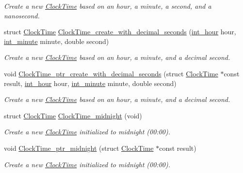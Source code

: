 \begin{DoxyCompactItemize}
\begin{DoxyCompactList}\small\item\em Create a new \hyperlink{structClockTime}{Clock\-Time} based on an hour, a minute, a second, and a nanosecond. \end{DoxyCompactList}\item 
struct \hyperlink{structClockTime}{Clock\-Time} \hyperlink{clock-time_8h_a519b7c6074cf1addc815f7495048c30b}{Clock\-Time\-\_\-create\-\_\-with\-\_\-decimal\-\_\-seconds} (\hyperlink{types_8h_abc83767329d565949a30f9990b5b2323}{int\-\_\-hour} hour, \hyperlink{types_8h_ac1c9417e7360815b48bbc1efa2b8240c}{int\-\_\-minute} minute, double second)
\begin{DoxyCompactList}\small\item\em Create a new \hyperlink{structClockTime}{Clock\-Time} based on an hour, a minute, and a decimal second. \end{DoxyCompactList}\item 
void \hyperlink{clock-time_8h_a87e3a723bf677b7be296bc439a05b910}{Clock\-Time\-\_\-ptr\-\_\-create\-\_\-with\-\_\-decimal\-\_\-seconds} (struct \hyperlink{structClockTime}{Clock\-Time} $\ast$const result, \hyperlink{types_8h_abc83767329d565949a30f9990b5b2323}{int\-\_\-hour} hour, \hyperlink{types_8h_ac1c9417e7360815b48bbc1efa2b8240c}{int\-\_\-minute} minute, double second)
\begin{DoxyCompactList}\small\item\em Create a new \hyperlink{structClockTime}{Clock\-Time} based on an hour, a minute, and a decimal second. \end{DoxyCompactList}\item 
struct \hyperlink{structClockTime}{Clock\-Time} \hyperlink{clock-time_8h_a03a50ba89456f73dfd83cf4b7da88036}{Clock\-Time\-\_\-midnight} (void)
\begin{DoxyCompactList}\small\item\em Create a new \hyperlink{structClockTime}{Clock\-Time} initialized to midnight (00\-:00). \end{DoxyCompactList}\item 
void \hyperlink{clock-time_8h_ab9a04af6aea163ab7682efd2ac6d2e71}{Clock\-Time\-\_\-ptr\-\_\-midnight} (struct \hyperlink{structClockTime}{Clock\-Time} $\ast$const result)
\begin{DoxyCompactList}\small\item\em Create a new \hyperlink{structClockTime}{Clock\-Time} initialized to midnight (00\-:00). \end{DoxyCompactList}\item 

\end{DoxyCompactItemize}
